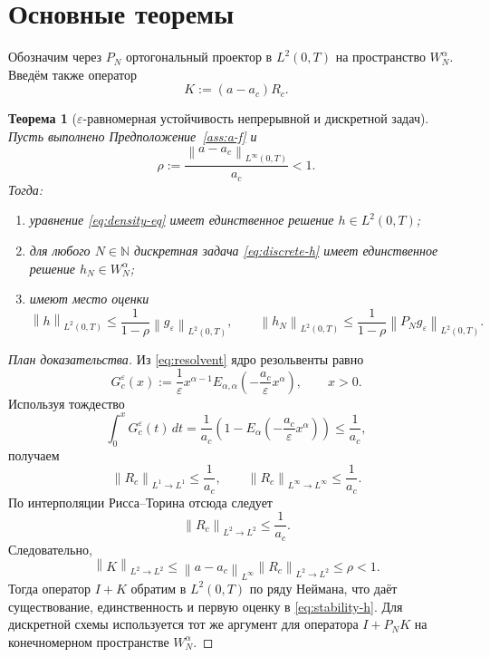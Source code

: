 \documentclass[12pt,a4paper]{article}
\newtheorem{theorem}{Теорема}[section]
\theoremstyle{definition}
\newcommand{\eps}{\varepsilon}
\newcommand{\N}{\mathbb{N}}
\newcommand{\Rc}{R_c}
\newcommand{\norm}[1]{\left\lVert #1 \right\rVert}
\begin{document}
\section{Основные теоремы}

Обозначим через $P_N$ ортогональный проектор в $L^2(0,T)$ на пространство $W_N^\alpha$.
Введём также оператор
\[
K:= (a-a_c)\Rc.
\]

\begin{theorem}[$\eps$-равномерная устойчивость непрерывной и дискретной задач]
\label{thm:stability}
Пусть выполнено Предположение~\ref{ass:a-f} и
\begin{equation}
\label{eq:rho}
\rho:=\frac{\norm{a-a_c}_{L^\infty(0,T)}}{a_c}<1.
\end{equation}
Тогда:
\begin{enumerate}[label=\textup{(\roman*)}]
\item уравнение \eqref{eq:density-eq} имеет единственное решение $h\in L^2(0,T)$;
\item для любого $N\in\N$ дискретная задача \eqref{eq:discrete-h} имеет единственное решение $h_N\in W_N^\alpha$;
\item имеют место оценки
\begin{equation}
\label{eq:stability-h}
\norm{h}_{L^2(0,T)}
\le
\frac{1}{1-\rho}\norm{g_\eps}_{L^2(0,T)},
\qquad
\norm{h_N}_{L^2(0,T)}
\le
\frac{1}{1-\rho}\norm{P_N g_\eps}_{L^2(0,T)}.
\end{equation}
\end{enumerate}
\end{theorem}

\begin{proof}[План доказательства]
Из \eqref{eq:resolvent} ядро резольвенты равно
\[
G_c^\eps(x):=\frac{1}{\eps}x^{\alpha-1}
E_{\alpha,\alpha}\!\left(-\frac{a_c}{\eps}x^\alpha\right), \qquad x>0.
\]
Используя тождество
\[
\int_0^x G_c^\eps(t)\,dt
=
\frac{1}{a_c}\left(1-E_\alpha\!\left(-\frac{a_c}{\eps}x^\alpha\right)\right)
\le \frac{1}{a_c},
\]
получаем
\[
\norm{\Rc}_{L^1\to L^1}\le \frac{1}{a_c},
\qquad
\norm{\Rc}_{L^\infty\to L^\infty}\le \frac{1}{a_c}.
\]
По интерполяции Рисса--Торина отсюда следует
\[
\norm{\Rc}_{L^2\to L^2}\le \frac{1}{a_c}.
\]
Следовательно,
\[
\norm{K}_{L^2\to L^2}
\le
\norm{a-a_c}_{L^\infty}\norm{\Rc}_{L^2\to L^2}
\le \rho<1.
\]
Тогда оператор $I+K$ обратим в $L^2(0,T)$ по ряду Неймана, что даёт существование,
единственность и первую оценку в \eqref{eq:stability-h}. Для дискретной схемы используется тот же аргумент
для оператора $I+P_NK$ на конечномерном пространстве $W_N^\alpha$.
\end{proof}
\end{document}
